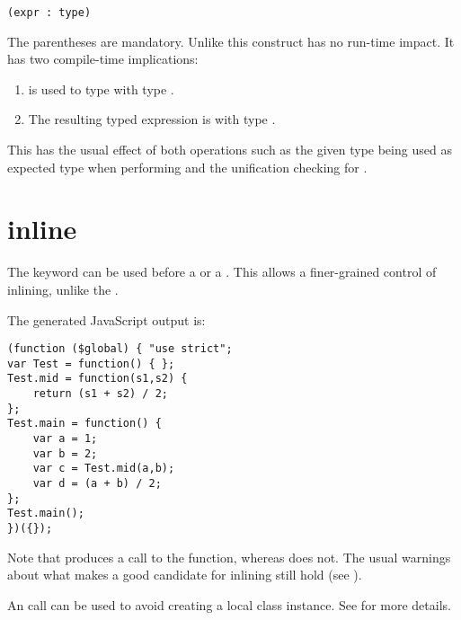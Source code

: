 \begin{lstlisting}
(expr : type)
\end{lstlisting}

The parentheses are mandatory. Unlike  this construct has no run-time impact. It has two compile-time implications:

\begin{enumerate}
\item {} is used to type  with type .
\item The resulting typed expression is  with type .
\end{enumerate}

This has the usual effect of both operations such as the given type being used as expected type when performing  and the unification checking for .


\section{inline}
\label{expression-inline}

The  keyword can be used before a  or a . This allows a finer-grained control of inlining, unlike the .


The generated JavaScript output is:

\begin{lstlisting}
(function ($global) { "use strict";
var Test = function() { };
Test.mid = function(s1,s2) {
	return (s1 + s2) / 2;
};
Test.main = function() {
	var a = 1;
	var b = 2;
	var c = Test.mid(a,b);
	var d = (a + b) / 2;
};
Test.main();
})({});
\end{lstlisting}

Note that  produces a call to the function, whereas  does not. The usual warnings about what makes a good candidate for inlining still hold (see ).

An  call can be used to avoid creating a local class instance. See  for more details.

